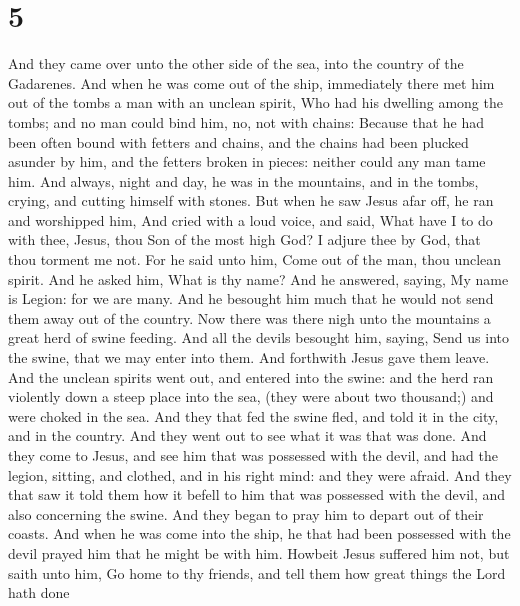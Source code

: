 \hypertarget{section-4}{%
\section{5}\label{section-4}}

 And they came over unto the other side of the sea, into the
country of the Gadarenes.  And when he was come out of the
ship, immediately there met him out of the tombs a man with an unclean
spirit,  Who had his dwelling among the tombs; and no man
could bind him, no, not with chains:  Because that he had
been often bound with fetters and chains, and the chains had been
plucked asunder by him, and the fetters broken in pieces: neither could
any man tame him.  And always, night and day, he was in the
mountains, and in the tombs, crying, and cutting himself with stones.
 But when he saw Jesus afar off, he ran and worshipped him,
 And cried with a loud voice, and said, What have I to do
with thee, Jesus, thou Son of the most high God? I adjure thee by God,
that thou torment me not.  For he said unto him, Come out of
the man, thou unclean spirit.  And he asked him, What is thy
name? And he answered, saying, My name is Legion: for we are many.
 And he besought him much that he would not send them away
out of the country.  Now there was there nigh unto the
mountains a great herd of swine feeding.  And all the
devils besought him, saying, Send us into the swine, that we may enter
into them.  And forthwith Jesus gave them leave. And the
unclean spirits went out, and entered into the swine: and the herd ran
violently down a steep place into the sea, (they were about two
thousand;) and were choked in the sea.  And they that fed
the swine fled, and told it in the city, and in the country. And they
went out to see what it was that was done.  And they come
to Jesus, and see him that was possessed with the devil, and had the
legion, sitting, and clothed, and in his right mind: and they were
afraid.  And they that saw it told them how it befell to
him that was possessed with the devil, and also concerning the swine.
 And they began to pray him to depart out of their coasts.
 And when he was come into the ship, he that had been
possessed with the devil prayed him that he might be with him.
 Howbeit Jesus suffered him not, but saith unto him, Go
home to thy friends, and tell them how great things the Lord hath done
